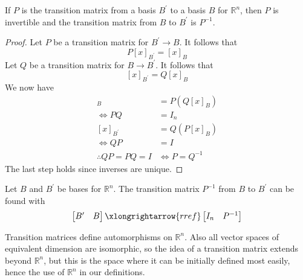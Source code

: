 \begin{theorem}
    If \(P\) is the transition matrix from a basis \(B^{\prime} \) to a basis \(B\) for \(\mathbb{R} ^n\), then \(P\) is invertible and the transition matrix from \(B\) to \(B^{\prime} \) is \(P ^{-1} \).
\end{theorem}
\begin{proof}
    Let \(P\) be a transition matrix for \(B^{\prime} \to B\). It follows that
    \[
        P[x]_{B^{\prime} }=[x]_B
    \]
    Let \(Q\) be a transition matrix for \(B\to B^{\prime} \). It follows that
    \[
        [x]_{B^{\prime} }=Q[x]_B
    \]
    We now have
    \begin{align*}
        [x]_B &=P\left( Q[x]_B \right)\\
        \iff PQ&=I_n\\
        [x]_{B^{\prime}} &=Q\left( P[x]_B \right)\\
        \iff QP&=I\\
        \therefore QP=PQ=I&\iff P=Q^{-1} 
    \end{align*}
    The last step holds since inverses are unique.
\end{proof}
\begin{theorem}
    Let \(B\) and \(B^{\prime} \) be bases for \(\mathbb{R}^n\). The transition matrix \(P ^{-1} \) from \(B\) to \(B^{\prime} \) can be found with
    \[
        \begin{bmatrix}
            B^{\prime}  &B   \\
        \end{bmatrix}\xlongrightarrow{rref} \begin{bmatrix}
            I_n &P ^{-1}    \\
        \end{bmatrix}
    \]
\end{theorem}
\begin{remark}
    Transition matrices define automorphisms on \(\mathbb{R}^n\). Also all vector spaces of equivalent dimension are isomorphic, so the idea of a transition matrix extends beyond \(\mathbb{R} ^n\), but this is the space where it can be initially defined most easily, hence the use of \(\mathbb{R}^n\) in our definitions.
\end{remark}